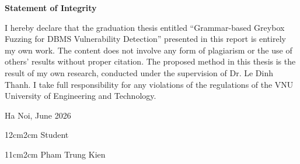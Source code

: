 \setcounter{page}{1}
\begin{center}
\textbf{\large{Statement of Integrity}}
\end{center}

I hereby declare that the graduation thesis entitled ``Grammar-based Greybox Fuzzing for DBMS Vulnerability Detection'' presented in this report is entirely my own work. The content does not involve any form of plagiarism or the use of others' results without proper citation. The proposed method in this thesis is the result of my own research, conducted under the supervision of Dr. Le Dinh Thanh. I take full responsibility for any violations of the regulations of the VNU University of Engineering and Technology.

\begin{flushright}
Ha Noi, June 2026
\end{flushright}

\begin{changemargin}{12cm}{2cm}
Student
\\[2cm]
\end{changemargin}

\begin{changemargin}{11cm}{2cm}
Pham Trung Kien
\end{changemargin}
